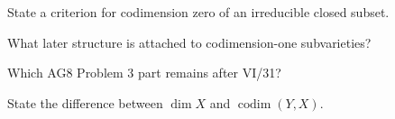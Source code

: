 \begin{exercise}[VI.31.E23]\label{exer:vi31-23}
State a criterion for codimension zero of an irreducible closed subset.
\end{exercise}

\begin{exercise}[VI.31.E24]\label{exer:vi31-24}
What later structure is attached to codimension-one subvarieties?
\end{exercise}

\begin{exercise}[VI.31.E25]\label{exer:vi31-25}
Which AG8 Problem 3 part remains after VI/31?
\end{exercise}

\begin{exercise}[VI.31.E26]\label{exer:vi31-26}
State the difference between $\dim X$ and $\operatorname{codim}(Y,X)$.
\end{exercise}